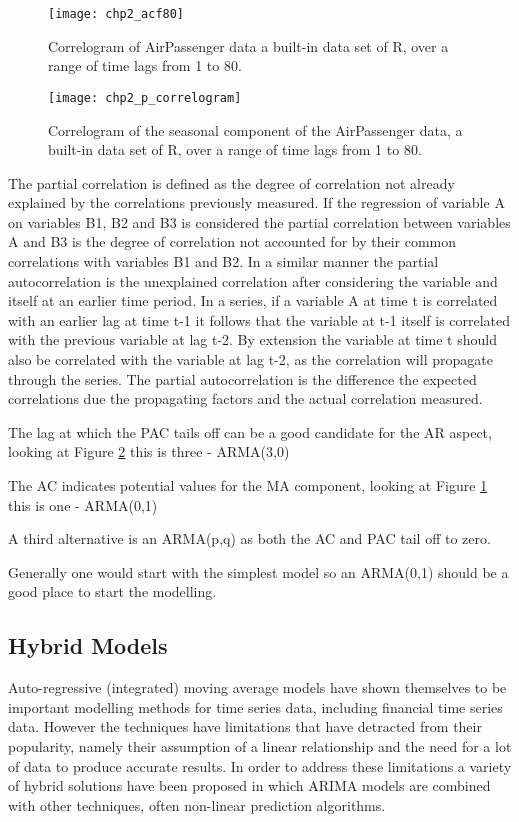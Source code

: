\begin{figure}[tbph!]
\centering
\texttt{[image: chp2\_acf80]}
\caption[Correlogram of a wide range of time lags.]{Correlogram of AirPassenger data a built-in data set of R, over a range of time lags from 1 to 80.}
\label{fig:acf80}
\end{figure}

\begin{figure}[tbph!]
\centering
\texttt{[image: chp2\_p\_correlogram]}
\caption[Correlogram of a seasonal component]{Correlogram of the seasonal component of the AirPassenger data, a built-in data set of R, over a range of time lags from 1 to 80.}
\label{fig:correlogram}
\end{figure}

The partial correlation is defined as the degree of correlation not already explained by the correlations previously measured. If the regression of variable A on variables B1, B2 and B3 is considered the partial correlation between variables A and B3 is the degree of correlation not accounted for by their common correlations with variables B1 and B2. In a similar manner the partial autocorrelation is the unexplained correlation after considering the variable and itself at an earlier time period. In a series, if a variable A at time t is correlated with an earlier lag at time t-1 it follows that the variable at t-1 itself is correlated with the previous variable at lag t-2. By extension the variable at time t should also be correlated with the variable at lag t-2, as the correlation will propagate through the series. The partial autocorrelation is the difference the expected correlations due the propagating factors and the actual correlation measured.

The lag at which the PAC tails off can be a good candidate for the AR aspect, looking at Figure \ref{fig:correlogram} this is three - ARMA(3,0)

The AC indicates potential values for the MA component, looking at Figure \ref{fig:acf80} this is one - ARMA(0,1)

A third alternative is an ARMA(p,q) as both the AC and PAC tail off to zero.

Generally one would start with the simplest model so an ARMA(0,1) should be a good place to start the modelling.

\subsection{Hybrid Models}
Auto-regressive (integrated) moving average models have shown themselves to be important modelling methods for time series data, including financial time series data. However the techniques have limitations that have detracted from their popularity, namely their assumption of a linear relationship and the need for a lot of data to produce accurate results. In order to address these limitations a variety of hybrid solutions have been proposed in which ARIMA models are combined with other techniques, often non-linear prediction algorithms.

